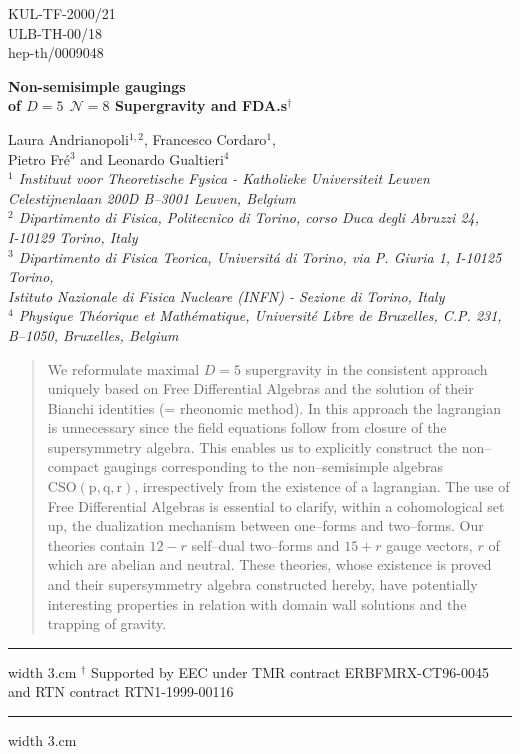 \documentclass[a4paper,12pt]{article}
\begin{document}
\begin{titlepage}
\begin{flushright}
KUL-TF-2000/21\\
ULB-TH-00/18\\
hep-th/0009048 \\
\end{flushright}
\vskip 2cm
\begin{center}
{\Large \bf
Non-semisimple gaugings \\ of $D=5~~\mathcal{N}=8$ Supergravity
and FDA.s$^\dagger$\\
}
\vfill

{\large  Laura Andrianopoli$^{1,2}$, Francesco Cordaro$^1$,}\\
{\large Pietro Fr\'e$^3$ and Leonardo Gualtieri$^4$} \\
\vfill
{ \sl
$^1$  Instituut voor Theoretische Fysica - Katholieke Universiteit Leuven
\\Celestijnenlaan 200D B--3001 Leuven, Belgium\\
$^2$ Dipartimento di Fisica, Politecnico di Torino, corso Duca
degli Abruzzi 24, \\
I-10129 Torino, Italy\\
 $^3$ Dipartimento di Fisica Teorica, Universit\'a di Torino,
via P. Giuria 1,
I-10125 Torino, \\
 Istituto Nazionale di Fisica Nucleare (INFN) - Sezione di Torino,
Italy \\
$^4$ Physique Th\'eorique et Math\'ematique, Universit\'e Libre de
Bruxelles, C.P. 231, B--1050, Bruxelles, Belgium }
\end{center}
\vfill
\begin{abstract}
{We reformulate maximal $D=5$ supergravity in the consistent approach uniquely
based on Free Differential Algebras and the solution of their
Bianchi identities (= rheonomic method).
In this approach the lagrangian is unnecessary since the field equations
follow from closure of the supersymmetry algebra.
This enables us to explicitly construct the non--compact gaugings
corresponding to the non--semisimple algebras $\mathrm{CSO(p,q,r)}$,
irrespectively from the existence of a lagrangian.
The use of Free Differential Algebras
is essential to clarify, within a cohomological set up,
the dualization mechanism between one--forms and two--forms. Our theories
contain $12-r$ self--dual two--forms and $15+r$ gauge vectors, $r$ of which
are abelian and neutral.
These theories, whose existence is proved and their supersymmetry algebra
constructed hereby, have potentially interesting properties in relation with
domain wall solutions and the trapping of gravity.
}
\end{abstract}
\vspace{2mm} \vfill \hrule width 3.cm
{\footnotesize
 $^ \dagger $ \hskip 0.1cm Supported by   EEC  under TMR contract
 ERBFMRX-CT96-0045 and RTN contract RTN1-1999-00116}
\vspace{2mm} \vfill \hrule width 3.cm
\end{titlepage}
\end{document}
